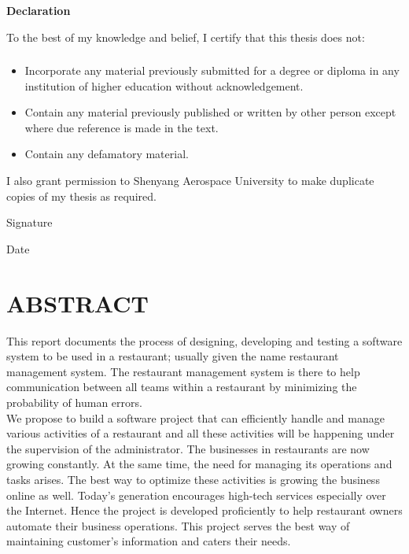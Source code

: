 \documentclass[12pt,a4paper]{article}
\newcommand\fillin[1][3cm]{\makebox[#1]{\dotfill}}
\begin{document}
\begin{titlepage}
\begin{center}
	{\huge\bfseries{Declaration}}\\ 
\end{center}
\vspace{3.5cm}
To the best of my knowledge and belief, I certify that this thesis does not:
\subsubsection*{}
\begin{itemize}
	\item Incorporate any material previously submitted for a degree or diploma in any institution of higher education without acknowledgement.
	\item Contain any material previously published or written by other person except where due reference is made in the text.
	\item Contain any defamatory material.
\end{itemize}
I also grant permission to Shenyang Aerospace University to make duplicate copies of my thesis as required.	\\
\linebreak
\linebreak
\linebreak
\linebreak
\linebreak

Signature\fillin[4cm]
\linebreak
\linebreak
\linebreak

Date\fillin[5cm]  

\end{titlepage}

	
	\section*{ABSTRACT}
	This report documents the process of designing, developing and testing a software system to be used in a
restaurant; usually given the name restaurant management system. The restaurant management system
is there to help communication between all teams within a restaurant by minimizing the probability
of human errors.\\We propose to build a software project that can efficiently handle and manage various activities of a restaurant and all these activities will be happening under the supervision of the administrator. The businesses in restaurants are now growing constantly. At the same time, the need for managing its operations and tasks arises. The best way to optimize these activities is growing the business online as well. Today’s generation encourages high-tech services especially over the Internet. Hence the project is developed proficiently to help restaurant owners automate their business operations. This project serves the best way of maintaining customer’s information and caters their needs.\\
\end{document}

